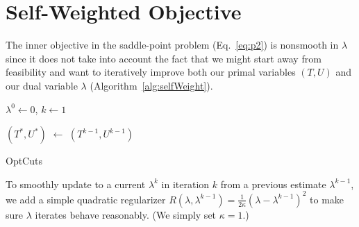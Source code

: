 
\section{Self-Weighted Objective}
\label{sec:self_weighting}


The inner objective in the saddle-point problem (Eq.~\ref{eq:p2}) is nonsmooth in $\lambda$ since it does not take into account the fact that we might start away from feasibility and want to iteratively improve both our primal variables $(T, U)$ and our dual variable $\lambda$ (Algorithm~\ref{alg:selfWeight}).
%

\begin{algorithm}[!h]
\SetAlgoLined
{}

$\lambda^0 \leftarrow 0$, $k \leftarrow 1$\;

$(T^*, U^*)$ $\leftarrow$ $(T^{k-1}, U^{k-1})$\; 

\caption{OptCuts}
\label{alg:selfWeight}
\end{algorithm}

To smoothly update to a current $\lambda^{k}$ in iteration $k$ from a previous estimate $\lambda^{k-1}$, we add a simple quadratic regularizer $R(\lambda,\lambda^{k-1}) = \frac{1}{2\kappa} (\lambda- \lambda^{k-1})^2$ to make sure $\lambda$ iterates behave reasonably. (We simply set $\kappa = 1$.)

